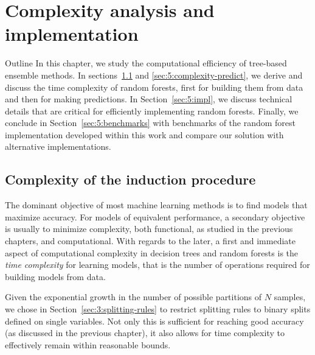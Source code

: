 \chapter{Complexity analysis and implementation}\label{ch:complexity}

\begin{remark}{Outline}
In this chapter, we study the computational efficiency of tree-based ensemble
methods. In sections~\ref{sec:5:complexity-fit} and \ref{sec:5:complexity-predict},
we derive and discuss the time complexity of random forests, first for building them from data and then for making predictions. In
Section~\ref{sec:5:impl}, we discuss technical details that are critical
for efficiently  implementing random forests. Finally, we conclude in
Section~\ref{sec:5:benchmarks} with benchmarks of the random forest implementation developed
within this work and compare our solution with alternative implementations.
\end{remark}

\section{Complexity of the induction procedure}
\label{sec:5:complexity-fit}

The dominant objective of most machine learning methods is to find models that
maximize accuracy. For models of equivalent performance, a secondary objective
is usually to minimize complexity, both functional, as studied in the previous
chapters, and computational. With regards to the later, a first and immediate
aspect of computational complexity in decision trees and random forests is the
\textit{time complexity} for learning models, that is the number of operations
required for building models from data.

Given the exponential growth in the number of possible partitions of $N$
samples, we chose in Section~\ref{sec:3:splitting-rules} to restrict splitting
rules to binary splits defined on single variables. Not only this is sufficient
for reaching good accuracy (as discussed in the previous chapter),
it also allows for time complexity to effectively remain within reasonable bounds.

